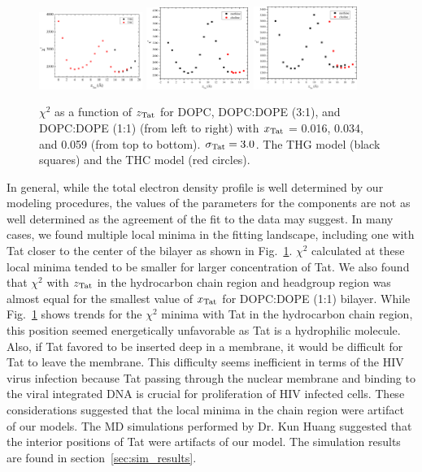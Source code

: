 \begin{figure}[htbp]
  \includegraphics[width=0.3\textwidth]{figures/Tat/SDP_Results/X2/DOPC_Tat_16to1_3p0_X2}
  \includegraphics[width=0.3\textwidth]{figures/Tat/SDP_Results/X2/DOPCDOPE3to1_Tat_16to1_3p0_X2}
  \includegraphics[width=0.3\textwidth]{figures/Tat/SDP_Results/X2/DOPCDOPE1to1_Tat_16to1_3p0_X2}
  \caption{$\chi^2$ as a function of $z_\textrm{Tat}$ for DOPC, DOPC:DOPE (3:1), and 
  DOPC:DOPE (1:1) (from left to right) 
  with $x_\textrm{Tat}$ = 0.016, 0.034, and 0.059 (from top to bottom). 
  $\sigma_\textrm{Tat} = 3.0$. The THG model (black squares) and the THC model (red circles).}
  \label{fig:DOPC_Tat_X2}
\end{figure}

In general, while the total electron density profile is well determined by 
our modeling procedures, the values of the parameters for the components are 
not as well determined as the agreement of the fit to the data may suggest. 
In many cases, we found multiple local minima in the fitting landscape, 
including one with Tat closer to the center of the bilayer as
shown in Fig.~\ref{fig:DOPC_Tat_X2}. $\chi^2$ calculated at these local minima 
tended to be smaller for larger concentration of Tat. We also found
that $\chi^2$ with $z_\textrm{Tat}$ in the hydrocarbon chain region and headgroup
region was almost equal for the smallest value of $x_\textrm{Tat}$ for DOPC:DOPE (1:1)
bilayer.
While Fig.~\ref{fig:DOPC_Tat_X2} shows trends for the $\chi^2$ minima with Tat 
in the hydrocarbon chain region, this position seemed energetically 
unfavorable as Tat is a hydrophilic molecule. Also, if Tat favored to be 
inserted deep in a membrane, it would be difficult for Tat to
leave the membrane. This difficulty seems inefficient in terms of the HIV virus
infection because Tat passing through the nuclear membrane and binding
to the viral integrated DNA is crucial for proliferation of HIV infected cells. 
These considerations suggested that the local minima in the chain region
were artifact of our models.
The MD simulations performed by Dr. Kun Huang suggested that
the interior positions of Tat were artifacts of our model. 
The simulation results are found in section~\ref{sec:sim_results}.

